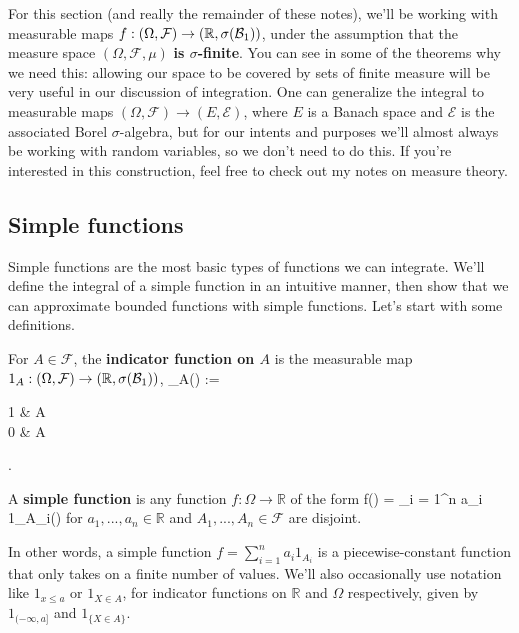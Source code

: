For this section (and really the remainder of these notes), we'll be working with measurable maps $f : (\Omega, \mathcal F)\rightarrow (\mathbb R, \sigma(\mathcal{B}_{1}))$, under the assumption that the measure space $(\Omega, \mathcal F, \mu)$ \textbf{is $\sigma$-finite}. You can see in some of the theorems why we need this: allowing our space to be covered by sets of finite measure will be very useful in our discussion of integration. One can generalize the integral to measurable maps $(\Omega, \mathcal F)\rightarrow (E, \mathcal E)$, where $E$ is a Banach space and $\mathcal E$ is the associated Borel $\sigma$-algebra, but for our intents and purposes we'll almost always be working with random variables, so we don't need to do this. If you're interested in this construction, feel free to check out my notes on measure theory. 

\subsection{Simple functions}

Simple functions are the most basic types of functions we can integrate. We'll define the integral of a simple function in an intuitive manner, then show that we can approximate bounded functions with simple functions. Let's start with some definitions.

\begin{definition}
	For $A\in\mathcal F$, the \textbf{indicator function on $A$} is the measurable map $1_A : (\Omega, \mathcal F)\rightarrow (\mathbb R, \sigma(\mathcal{B}_{1}))$,
	_A(\omega) := \begin{cases}1 & \omega\in A \\ 0 & \omega\notin A \end{cases}. 
	\qe
\end{definition}
\begin{definition}
	A \textbf{simple function} is any function $f : \Omega\rightarrow\mathbb R$ of the form 
	\eq
		f(\omega) = \sum_{i = 1}^n a_i 1_{A_i}(\omega)
	\qe
	for $a_1, ..., a_n\in\mathbb R$ and $A_1, ..., A_n\in\mathcal F$ are disjoint. 
\end{definition}

In other words, a simple function $f = \sum_{i = 1}^n a_i 1_{A_i}$ is a piecewise-constant function that only takes on a finite number of values. We'll also occasionally use notation like $1_{x\leq a}$ or $1_{X\in A}$, for indicator functions on $\mathbb R$ and $\Omega$ respectively, given by $1_{(-\infty, a]}$ and $1_{\{X\in A\}}$. 


